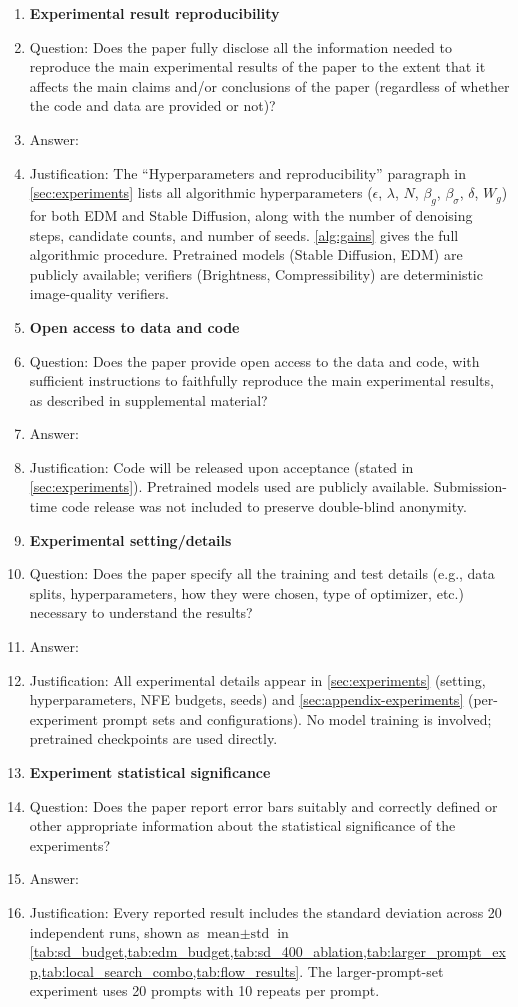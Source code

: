 \begin{enumerate}
\item {\bf Experimental result reproducibility}
\item[] Question: Does the paper fully disclose all the information needed to reproduce the main experimental results of the paper to the extent that it affects the main claims and/or conclusions of the paper (regardless of whether the code and data are provided or not)?
\item[] Answer: \answerYes{}
\item[] Justification: The ``Hyperparameters and reproducibility'' paragraph in \cref{sec:experiments} lists all algorithmic hyperparameters ($\epsilon$, $\lambda$, $N$, $\beta_g$, $\beta_\sigma$, $\delta$, $W_g$) for both EDM and Stable Diffusion, along with the number of denoising steps, candidate counts, and number of seeds. \cref{alg:gains} gives the full algorithmic procedure. Pretrained models (Stable Diffusion, EDM) are publicly available; verifiers (Brightness, Compressibility) are deterministic image-quality verifiers.

\item {\bf Open access to data and code}
\item[] Question: Does the paper provide open access to the data and code, with sufficient instructions to faithfully reproduce the main experimental results, as described in supplemental material?
\item[] Answer: \answerNo{}
\item[] Justification: Code will be released upon acceptance (stated in \cref{sec:experiments}). Pretrained models used are publicly available. Submission-time code release was not included to preserve double-blind anonymity.

\item {\bf Experimental setting/details}
\item[] Question: Does the paper specify all the training and test details (e.g., data splits, hyperparameters, how they were chosen, type of optimizer, etc.) necessary to understand the results?
\item[] Answer: \answerYes{}
\item[] Justification: All experimental details appear in \cref{sec:experiments} (setting, hyperparameters, NFE budgets, seeds) and \cref{sec:appendix-experiments} (per-experiment prompt sets and configurations). No model training is involved; pretrained checkpoints are used directly.

\item {\bf Experiment statistical significance}
\item[] Question: Does the paper report error bars suitably and correctly defined or other appropriate information about the statistical significance of the experiments?
\item[] Answer: \answerYes{}
\item[] Justification: Every reported result includes the standard deviation across 20 independent runs, shown as $\text{mean} \pm \text{std}$ in \cref{tab:sd_budget,tab:edm_budget,tab:sd_400_ablation,tab:larger_prompt_exp,tab:local_search_combo,tab:flow_results}. The larger-prompt-set experiment uses 20 prompts with 10 repeats per prompt.


\end{enumerate}
